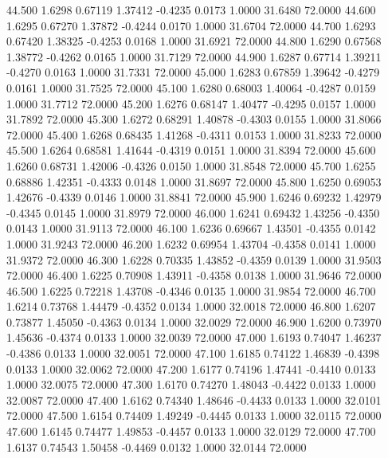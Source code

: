   44.500   1.6298   0.67119   1.37412  -0.4235   0.0173   1.0000  31.6480  72.0000
  44.600   1.6295   0.67270   1.37872  -0.4244   0.0170   1.0000  31.6704  72.0000
  44.700   1.6293   0.67420   1.38325  -0.4253   0.0168   1.0000  31.6921  72.0000
  44.800   1.6290   0.67568   1.38772  -0.4262   0.0165   1.0000  31.7129  72.0000
  44.900   1.6287   0.67714   1.39211  -0.4270   0.0163   1.0000  31.7331  72.0000
  45.000   1.6283   0.67859   1.39642  -0.4279   0.0161   1.0000  31.7525  72.0000
  45.100   1.6280   0.68003   1.40064  -0.4287   0.0159   1.0000  31.7712  72.0000
  45.200   1.6276   0.68147   1.40477  -0.4295   0.0157   1.0000  31.7892  72.0000
  45.300   1.6272   0.68291   1.40878  -0.4303   0.0155   1.0000  31.8066  72.0000
  45.400   1.6268   0.68435   1.41268  -0.4311   0.0153   1.0000  31.8233  72.0000
  45.500   1.6264   0.68581   1.41644  -0.4319   0.0151   1.0000  31.8394  72.0000
  45.600   1.6260   0.68731   1.42006  -0.4326   0.0150   1.0000  31.8548  72.0000
  45.700   1.6255   0.68886   1.42351  -0.4333   0.0148   1.0000  31.8697  72.0000
  45.800   1.6250   0.69053   1.42676  -0.4339   0.0146   1.0000  31.8841  72.0000
  45.900   1.6246   0.69232   1.42979  -0.4345   0.0145   1.0000  31.8979  72.0000
  46.000   1.6241   0.69432   1.43256  -0.4350   0.0143   1.0000  31.9113  72.0000
  46.100   1.6236   0.69667   1.43501  -0.4355   0.0142   1.0000  31.9243  72.0000
  46.200   1.6232   0.69954   1.43704  -0.4358   0.0141   1.0000  31.9372  72.0000
  46.300   1.6228   0.70335   1.43852  -0.4359   0.0139   1.0000  31.9503  72.0000
  46.400   1.6225   0.70908   1.43911  -0.4358   0.0138   1.0000  31.9646  72.0000
  46.500   1.6225   0.72218   1.43708  -0.4346   0.0135   1.0000  31.9854  72.0000
  46.700   1.6214   0.73768   1.44479  -0.4352   0.0134   1.0000  32.0018  72.0000
  46.800   1.6207   0.73877   1.45050  -0.4363   0.0134   1.0000  32.0029  72.0000
  46.900   1.6200   0.73970   1.45636  -0.4374   0.0133   1.0000  32.0039  72.0000
  47.000   1.6193   0.74047   1.46237  -0.4386   0.0133   1.0000  32.0051  72.0000
  47.100   1.6185   0.74122   1.46839  -0.4398   0.0133   1.0000  32.0062  72.0000
  47.200   1.6177   0.74196   1.47441  -0.4410   0.0133   1.0000  32.0075  72.0000
  47.300   1.6170   0.74270   1.48043  -0.4422   0.0133   1.0000  32.0087  72.0000
  47.400   1.6162   0.74340   1.48646  -0.4433   0.0133   1.0000  32.0101  72.0000
  47.500   1.6154   0.74409   1.49249  -0.4445   0.0133   1.0000  32.0115  72.0000
  47.600   1.6145   0.74477   1.49853  -0.4457   0.0133   1.0000  32.0129  72.0000
  47.700   1.6137   0.74543   1.50458  -0.4469   0.0132   1.0000  32.0144  72.0000
